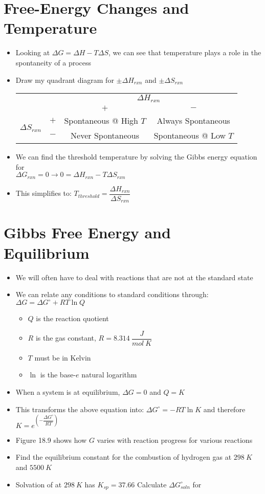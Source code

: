 \documentclass[12pt, openany, letterpaper]{memoir}
\begin{document}
\section{Free-Energy Changes and Temperature}
\begin{itemize}
	\item Looking at $\Delta G = \Delta H - T\Delta S$, we can see that temperature plays a role in the spontaneity of a process
	\item Draw my quadrant diagram for $\pm\Delta H_{rxn}$ and $\pm\Delta S_{rxn}$
	
	\begin{tabular}{cc|c|c|}
		&& \multicolumn{2}{c}{$\Delta H_{rxn}$}\\
		&& $+$ & $-$ \\ \midrule
		\multirow{2}{*}{$\Delta S_{rxn}$} & $+$ & Spontaneous @ High $T$ & Always Spontaneous \\ \cmidrule{2-4}
		& $-$ & Never Spontaneous & Spontaneous @ Low $T$ \\ \midrule
	\end{tabular}
	\item We can find the threshold temperature by solving the Gibbs energy equation for\\$\Delta G_{rxn} = 0 \rightarrow 0 = \Delta H_{rxn} - T\Delta S_{rxn}$
	\item This simplifies to: $T_{threshold}=\dfrac{\Delta H_{rxn}}{\Delta S_{rxn}}$
\end{itemize}
\section{Gibbs Free Energy and Equilibrium}
\begin{itemize}
	\item We will often have to deal with reactions that are not at the standard state
	\item We can relate any conditions to standard conditions through: $\Delta G = \Delta G^{\circ} + RT\ln Q$
	\begin{itemize}
		\item $Q$ is the reaction quotient
		\item $R$ is the gas constant, $R=8.314~\dfrac{J}{mol~K}$
		\item $T$ must be in Kelvin
		\item $\ln$ is the base-$e$ natural logarithm
	\end{itemize}
	\item When a system is at equilibrium, $\Delta G=0$ and $Q=K$
	\item This transforms the above equation into: $\Delta G^{\circ} = -RT\ln K$ and therefore $K = e^{\left(-\dfrac{\Delta G^{\circ}}{RT}\right)}$
	\item Figure 18.9 shows how $G$ varies with reaction progress for various reactions
	\item Find the equilibrium constant for the combustion of hydrogen gas at $298~K$ and $5500~K$
	\item Solvation of  at $298~K$ has $K_{sp}=37.66$ Calculate $\Delta G^{\circ}_{soln}$ for 
\end{itemize}
\end{document}
